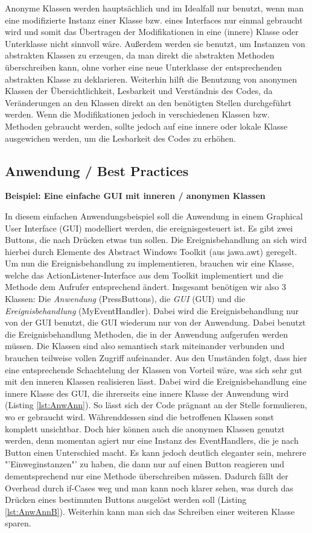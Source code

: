 Anonyme Klassen werden hauptsächlich und im Idealfall nur benutzt, wenn man eine modifizierte Instanz einer Klasse bzw. eines Interfaces nur einmal gebraucht wird und somit das Übertragen der Modifikationen in eine (innere) Klasse oder Unterklasse nicht sinnvoll wäre.
Außerdem werden sie benutzt, um Instanzen von abstrakten Klassen zu erzeugen, da man direkt die abstrakten Methoden überschreiben kann, ohne vorher eine neue Unterklasse der entsprechenden abstrakten Klasse zu deklarieren.
Weiterhin hilft die Benutzung von anonymen Klassen der Übersichtlichkeit, Lesbarkeit und Verständnis des Codes, da Veränderungen an den Klassen direkt an den benötigten Stellen durchgeführt werden.
Wenn die Modifikationen jedoch in verschiedenen Klassen bzw. Methoden gebraucht werden, sollte jedoch auf eine innere oder lokale Klasse ausgewichen werden, um die Lesbarkeit des Codes zu erhöhen.
\newpage
\subsection{Anwendung / Best Practices}

{\bf Beispiel: Eine einfache GUI mit inneren / anonymen Klassen}

In diesem einfachen Anwendungsbeispiel soll die Anwendung in einem Graphical User Interface (GUI) modelliert werden, die ereignisgesteuert ist.
Es gibt zwei Buttons, die nach Drücken etwas tun sollen.
Die Ereignisbehandlung an sich wird hierbei durch Elemente des Abstract Windows Toolkit (aus jawa.awt) geregelt.
Um nun die Ereignisbehandlung zu implementieren, brauchen wir eine Klasse, welche das ActionListener-Interface aus dem Toolkit implementiert und die Methode dem Aufrufer entsprechend ändert.
Insgesamt benötigen wir also 3 Klassen: Die {\it Anwendung} (PressButtons), die {\it GUI} (GUI) und die {\it Ereignisbehandlung} (MyEventHandler). Dabei wird die Ereignisbehandlung nur von der GUI benutzt, die GUI wiederum nur von der Anwendung. Dabei benutzt die Ereignisbehandlung Methoden, die in der Anwendung aufgerufen werden müssen.
Die Klassen sind also semantisch stark miteinander verbunden und brauchen teilweise vollen Zugriff aufeinander.
Aus den Umständen folgt, dass hier eine entsprechende Schachtelung der Klassen von Vorteil wäre, was sich sehr gut mit den inneren Klassen realisieren lässt.
Dabei wird die Ereignisbehandlung eine innere Klasse des GUI, die ihrerseits eine innere Klasse der Anwendung wird (Listing \ref{lst:AnwAnn}).
So lässt sich der Code prägnant an der Stelle formulieren, wo er gebraucht wird.
Währenddessen sind die betroffenen Klassen sonst komplett unsichtbar.
Doch hier können auch die anonymen Klassen genutzt werden, denn momentan agiert nur eine Instanz des EventHandlers, die je nach Button einen Unterschied macht. Es kann jedoch deutlich eleganter sein, mehrere "'Einweginstanzen"' zu haben, die dann nur auf einen Button reagieren und dementsprechend nur eine Methode überschreiben müssen.
Dadurch fällt der Overhead durch if-Cases weg und man kann noch klarer sehen, was durch das Drücken eines bestimmten Buttons ausgelöst werden soll (Listing \ref{lst:AnwAnnB}). Weiterhin kann man sich das Schreiben einer weiteren Klasse sparen.
\\
\\

